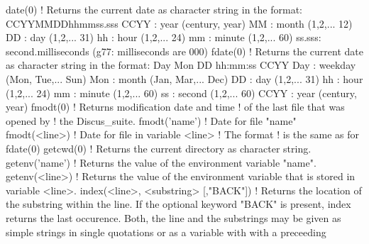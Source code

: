 \begin{MacVerbatim}
date(0)                         ! Returns the current date as character
                                  string in the format:
                                  CCYYMMDDhhmmss.sss
                                  CCYY  : year    (century, year)
                                  MM    : month   (1,2,... 12)
                                  DD    : day     (1,2,... 31)
                                  hh    : hour    (1,2,... 24)
                                  mm    : minute  (1,2,... 60)
                                  ss.sss: second.milliseconds
                                  (g77: milliseconds are 000)
fdate(0)                        ! Returns the current date as character
                                  string in the format:
                                  Day Mon DD hh:mm:ss CCYY
                                  Day   : weekday (Mon, Tue,... Sun)
                                  Mon   : month   (Jan, Mar,... Dec)
                                  DD    : day     (1,2,... 31)
                                  hh    : hour    (1,2,... 24)
                                  mm    : minute  (1,2,... 60)
                                  ss    : second  (1,2,... 60)
                                  CCYY  : year    (century, year)
fmodt(0)                        ! Returns modification date and time
                                ! of the last file that was opened by
                                ! the Discus_suite.
fmodt('name')                   ! Date for file "name"
fmodt(<line>)                   ! Date for file in variable <line>
                                ! The format ! is the same as for fdate(0)
getcwd(0)                       ! Returns the current directory as
                                  character string.
getenv('name')                  ! Returns the value of the environment
                                  variable "name".
getenv(<line>)                  ! Returns the value of the environment
                                  variable that is stored in variable <line>.
index(<line>, <substring> [,"BACK"]) ! Returns the location of the
                                  substring within the line.
                                  If the optional keyword "BACK" is present,
                                  index returns the last occurence.
                                  Both, the line and the substrings may be
                                  given as simple strings in single quotations
                                  or as a variable with with a preceeding

\end{MacVerbatim}
